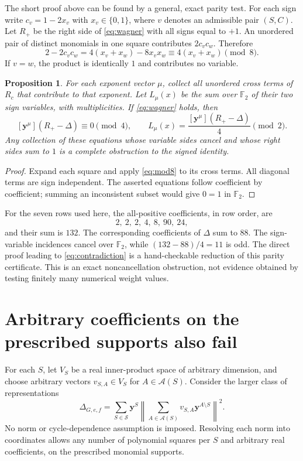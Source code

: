 \documentclass[11pt,a4paper]{article}
\newtheorem{proposition}[theorem]{Proposition}
\newcommand{\SSS}{\mathcal S}
\newcommand{\Asets}{\mathcal A}
\newcommand{\Ftwo}{\mathbb F_2}
\newcommand{\coef}[2]{[\boldsymbol y^{#1}]#2}
\begin{document}
The short proof above can be found by a general, exact parity test.
For each sign write $c_v=1-2x_v$ with $x_v\in\{0,1\}$, where
$v$ denotes an admissible pair $(S,C)$. Let $R_+$ be the right
side of \eqref{eq:wagner} with all signs equal to $+1$.
An unordered pair of distinct monomials in one square contributes
$2c_vc_w$. Therefore
\begin{equation}\label{eq:mod8}
 2-2c_vc_w=4(x_v+x_w)-8x_vx_w
              \equiv4(x_v+x_w)\pmod8.
\end{equation}
If $v=w$, the product is identically $1$ and contributes no variable.

\begin{proposition}\label{prop:mod8}
For each exponent vector $\mu$, collect all unordered cross terms
of $R_c$ that contribute to that exponent. Let $L_\mu(x)$ be the
sum over $\Ftwo$ of their two sign variables, with multiplicities.
If \eqref{eq:wagner} holds, then
\[
 \coef{\mu}{(R_+-\Delta)}\equiv0\pmod4,
 \qquad
 L_\mu(x)=\frac{\coef{\mu}{(R_+-\Delta)}}4\pmod2.
\]
Any collection of these equations whose variable sides cancel and
whose right sides sum to $1$ is a complete obstruction to the
signed identity.
\end{proposition}
\begin{proof}
Expand each square and apply \eqref{eq:mod8} to its cross terms.
All diagonal terms are sign independent. The asserted equations
follow coefficient by coefficient; summing an inconsistent subset
would give $0=1$ in $\Ftwo$.
\end{proof}

For the seven rows used here, the all-positive coefficients,
in row order, are
\[
 2,\ 2,\ 2,\ 4,\ 8,\ 90,\ 24,
\]
and their sum is $132$. The corresponding coefficients of
$\Delta$ sum to $88$. The sign-variable incidences cancel over
$\Ftwo$, while $(132-88)/4=11$ is odd. The direct proof leading to
\eqref{eq:contradiction} is a hand-checkable reduction of this
parity certificate. This is an exact noncancellation obstruction,
not evidence obtained by testing finitely many numerical weight values.

\section{Arbitrary coefficients on the prescribed supports also fail}
\label{sec:unitvectors}

For each $S$, let $V_S$ be a real inner-product space of arbitrary
dimension, and choose arbitrary vectors $v_{S,A}\in V_S$ for
$A\in\Asets(S)$. Consider the larger class of representations
\begin{equation}\label{eq:vectors}
 \Delta_{G,e,f}=\sum_{S\in\SSS}\boldsymbol y^S
 \left\|\sum_{A\in\Asets(S)}
         v_{S,A}\boldsymbol y^{A\setminus S}\right\|^2.
\end{equation}
No norm or cycle-dependence assumption is imposed. Resolving each
norm into coordinates allows any number of polynomial squares per
$S$ and arbitrary real coefficients, on the prescribed monomial supports.
\end{document}
